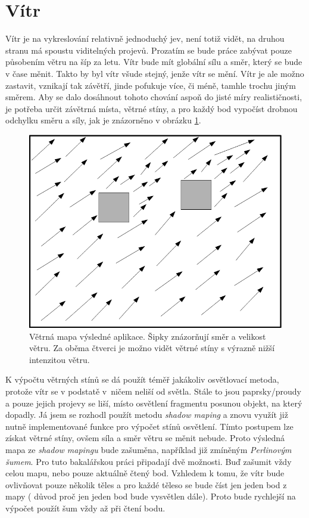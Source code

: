 \section{Vítr}
Vítr je na vykreslování relativně jednoduchý jev, není totiž vidět, na druhou stranu má spoustu viditelných projevů. Prozatím se bude práce zabývat pouze působením větru na šíp za letu.
Vítr bude mít globální sílu a směr, který se bude v čase měnit. Takto by byl vítr všude stejný, jenže vítr se mění. Vítr je ale možno zastavit, vznikají tak závětří, jinde pofukuje více, či méně, tamhle trochu jiným směrem. Aby se dalo dosáhnout tohoto chování aspoň do jisté míry realističnosti, je potřeba určit závětrná místa, větrné stíny, a pro každý bod vypočíst drobnou odchylku směru a síly, jak je znázorněno v obrázku \ref{windmap}.

\begin{figure}
	\begin{center}
		\includegraphics[scale=0.5]{obrazky-figures/windMap}
		\caption{Větrná mapa výsledné aplikace. Šipky znázorňují směr a velikost větru. Za oběma čtverci je možno vidět větrné stíny s výrazně nižší intenzitou větru.}\label{windmap}
\end{center}\end{figure}
K výpočtu větrných stínů se dá použít téměř jakákoliv osvětlovací metoda, protože vítr se v podstatě v~ničem neliší od světla. Stále to jsou paprsky/proudy a pouze jejich projevy se liší, místo osvětlení fragmentu posunou objekt, na který dopadly. Já jsem se rozhodl použít metodu \emph{shadow maping} a znovu využít již nutně implementované funkce pro výpočet stínů osvětlení. Tímto postupem lze získat větrné stíny, ovšem síla a směr větru se měnit nebude. Proto výsledná mapa ze \emph{shadow mapingu} bude zašuměna, například již zmíněným \emph{Perlinovým šumem}. Pro tuto bakalářskou práci připadají dvě možnosti. Buď zašumit vždy celou mapu, nebo pouze aktuálně čtený bod. Vzhledem k tomu, že vítr bude ovlivňovat pouze několik těles a pro každé těleso se bude číst jen jeden bod z mapy ( důvod proč jen jeden bod bude vysvětlen dále). Proto bude rychlejší na výpočet použít šum vždy až při čtení bodu.

